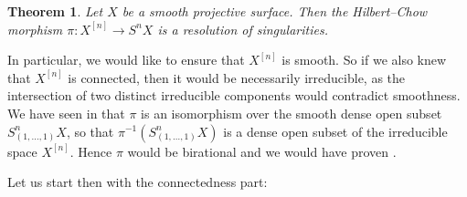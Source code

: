 \documentclass[12pt,a4paper]{amsart}
\theoremstyle{plain}
\newtheorem{thm}{Theorem}[section]
\theoremstyle{definition}
\theoremstyle{remark}
\begin{document}
\begin{thm}\label{thm:resolution}
  Let $X$ be a smooth projective surface.
  Then the Hilbert--Chow morphism $\pi \colon X^{[n]} \to S^{n}X$ is a resolution of singularities.
\end{thm}

In particular, we would like to ensure that $X^{[n]}$ is smooth.
So if we also knew that $X^{[n]}$ is connected, then it would be necessarily irreducible, as the intersection of two distinct irreducible components would contradict smoothness.
We have seen in  that $\pi$ is an isomorphism over the smooth dense open subset $S^{n}_{(1,\ldots,1)}X$, so that $\pi^{-1}(S^{n}_{(1, \ldots, 1)}X)$ is a dense open subset of the irreducible space $X^{[n]}$.
Hence $\pi$ would be birational and we would have proven .

Let us start then with the connectedness part:
\end{document}
